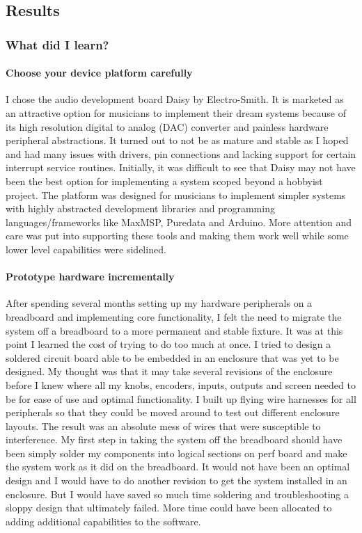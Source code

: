 \documentclass[acmlarge,screen]{acmart}
\begin{document}
\subsection{Results}
	\subsubsection{What did I learn?}
	
	\paragraph{Choose your device platform carefully} I chose the audio development board Daisy by Electro-Smith. It is marketed as an attractive option for musicians to implement their dream systems because of its high resolution digital to analog (DAC) converter and painless hardware peripheral abstractions. It turned out to not be as mature and stable as I hoped and had many issues with drivers, pin connections and lacking support for certain interrupt service routines. Initially, it was difficult to see that Daisy may not have been the best option for implementing a system scoped beyond a hobbyist project. The platform was designed for musicians to implement simpler systems with highly abstracted development libraries and programming languages/frameworks like MaxMSP, Puredata and Arduino. More attention and care was put into supporting these tools and making them work well while some lower level capabilities were sidelined.
	
	\paragraph{Prototype hardware incrementally} After spending several months setting up my hardware peripherals on a breadboard and implementing core functionality, I felt the need to migrate the system off a breadboard to a more permanent and stable fixture. It was at this point I learned the cost of trying to do too much at once. I tried to design a soldered circuit board able to be embedded in an enclosure that was yet to be designed. My thought was that it may take several revisions of the enclosure before I knew where all my knobs, encoders, inputs, outputs and screen needed to be for ease of use and optimal functionality. I built up flying wire harnesses for all peripherals so that they could be moved around to test out different enclosure layouts. The result was an absolute mess of wires that were susceptible to interference. My first step in taking the system off the breadboard should have been simply solder my components into logical sections on perf board and make the system work as it did on the breadboard. It would not have been an optimal design and I would have to do another revision to get the system installed in an enclosure. But I would have saved so much time soldering and troubleshooting a sloppy design that ultimately failed. More time could have been allocated to adding additional capabilities to the software.
	
\end{document}
